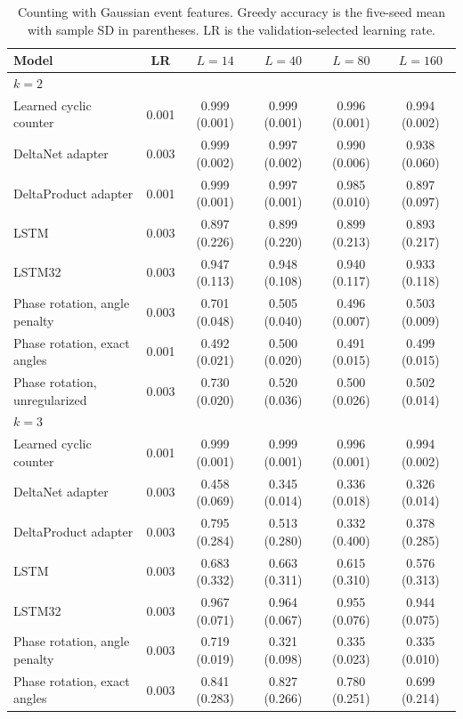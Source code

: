 \begin{table}[H]
\centering\small
\caption{Counting with Gaussian event features. Greedy accuracy is the five-seed mean
with sample SD in parentheses. LR is the validation-selected learning rate.}
\label{tab:newseq2}
\label{tab:newseq3}
\label{tab:newseq4}
\setlength{\tabcolsep}{3pt}
\begin{tabular}{lccccc}
\toprule
Model & LR & $L=14$ & $L=40$ & $L=80$ & $L=160$ \\
\midrule
\multicolumn{6}{l}{\emph{$k=2$}} \\
Learned cyclic counter & 0.001 & 0.999 (0.001) & 0.999 (0.001) & 0.996 (0.001) & 0.994 (0.002) \\
DeltaNet adapter & 0.003 & 0.999 (0.002) & 0.997 (0.002) & 0.990 (0.006) & 0.938 (0.060) \\
DeltaProduct adapter & 0.001 & 0.999 (0.001) & 0.997 (0.001) & 0.985 (0.010) & 0.897 (0.097) \\
LSTM & 0.003 & 0.897 (0.226) & 0.899 (0.220) & 0.899 (0.213) & 0.893 (0.217) \\
LSTM32 & 0.003 & 0.947 (0.113) & 0.948 (0.108) & 0.940 (0.117) & 0.933 (0.118) \\
Phase rotation, angle penalty & 0.003 & 0.701 (0.048) & 0.505 (0.040) & 0.496 (0.007) & 0.503 (0.009) \\
Phase rotation, exact angles & 0.001 & 0.492 (0.021) & 0.500 (0.020) & 0.491 (0.015) & 0.499 (0.015) \\
Phase rotation, unregularized & 0.003 & 0.730 (0.020) & 0.520 (0.036) & 0.500 (0.026) & 0.502 (0.014) \\
\midrule
\multicolumn{6}{l}{\emph{$k=3$}} \\
Learned cyclic counter & 0.001 & 0.999 (0.001) & 0.999 (0.001) & 0.996 (0.001) & 0.994 (0.002) \\
DeltaNet adapter & 0.003 & 0.458 (0.069) & 0.345 (0.014) & 0.336 (0.018) & 0.326 (0.014) \\
DeltaProduct adapter & 0.003 & 0.795 (0.284) & 0.513 (0.280) & 0.332 (0.400) & 0.378 (0.285) \\
LSTM & 0.003 & 0.683 (0.332) & 0.663 (0.311) & 0.615 (0.310) & 0.576 (0.313) \\
LSTM32 & 0.003 & 0.967 (0.071) & 0.964 (0.067) & 0.955 (0.076) & 0.944 (0.075) \\
Phase rotation, angle penalty & 0.003 & 0.719 (0.019) & 0.321 (0.098) & 0.335 (0.023) & 0.335 (0.010) \\
Phase rotation, exact angles & 0.003 & 0.841 (0.283) & 0.827 (0.266) & 0.780 (0.251) & 0.699 (0.214) \\

\end{tabular}
\end{table}
